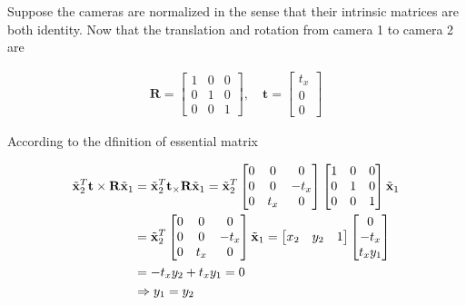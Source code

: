 \documentclass[11pt]{article}
\begin{document}
\newcommand {\rotation} {\mathbf{R}}
\newcommand {\translation} {\mathbf{t}}

Suppose the cameras are normalized in the sense that their intrinsic matrices are both identity.
Now that the translation and rotation from camera 1 to camera 2 are

\begin{align}
    \rotation =
    \begin{bmatrix}
        1 & 0 & 0 \\
        0 & 1 & 0 \\
        0 & 0 & 1
    \end{bmatrix}, \quad
    \translation =
    \begin{bmatrix}
        t_x \\ 0 \\ 0
    \end{bmatrix}
\end{align}

According to the dfinition of essential matrix

\begin{align}
    \homox_2^T \translation \times \rotation \homox_1 &=
    \homox_2^T \translation_\times \rotation \homox_1 =
    \homox_2^T
    \begin{bmatrix}
        0 & 0 & 0 \\
        0 & 0 & -t_x \\
        0 & t_x & 0 \\
    \end{bmatrix}
    \begin{bmatrix}
        1 & 0 & 0 \\
        0 & 1 & 0 \\
        0 & 0 & 1
    \end{bmatrix}
    \homox_1
    \\ &=
    \homox_2^T
    \begin{bmatrix}
        0 & 0 & 0 \\
        0 & 0 & -t_x \\
        0 & t_x & 0 \\
    \end{bmatrix}
    \homox_1 =
    \begin{bmatrix}
        x_2 & y_2 & 1
    \end{bmatrix}
    \begin{bmatrix}
        0 \\ -t_x \\ t_x y_1
    \end{bmatrix}
    \\ &=
    -t_x y_2 + t_x y_1 = 0
    \\ & \Rightarrow
    y_1 = y_2
\end{align}
\end{document}
